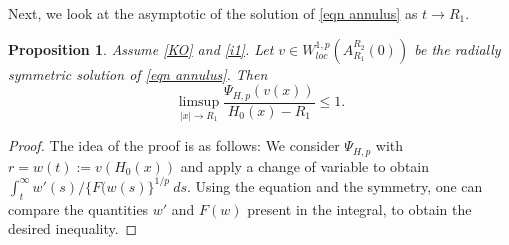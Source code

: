 \documentclass[11pt]{amsart}
\newtheorem{proposition}[theorem]{Proposition}
\numberwithin{equation}{section}
\begin{document}
   Next, we look at the asymptotic of the solution of \eqref{eqn annulus} as $t\to R_{1}$.
   \begin{proposition}\label{prop annuls asym}
       Assume \ref{KO} and \ref{i1}. Let $v\in W_{loc}^{1,p}(A_{R_{1}}^{R_{2}}(0))$ be the radially symmetric solution of \eqref{eqn annulus}. Then 
       \begin{equation*}
           \limsup_{|x|\to R_{1}}\frac{\Psi_{H,p}\left(v(x)\right)}{H_{0}(x)-R_{1}}\leq 1.
       \end{equation*}
   \end{proposition}
\begin{proof}
The idea of the proof is as follows: We consider $\Psi_{H,p}$ with $r=w(t):=v(H_{0}(x))$ and apply a change of variable to obtain $\int_{t}^{\infty}w'(s)/\{F(w(s)\}^{1/p}~ds$. Using the equation and the symmetry, one can compare the quantities $w'$ and $F(w)$ present in the integral, to obtain the desired inequality.  



\end{proof}
\end{document}
